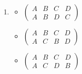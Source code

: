 \begin{enumerate}[{a.}]
\begin{multicols}{3}
\begin{itemize}
	\item
	$\begin{pmatrix}
	A & B & C & D\\
	D & A & B & C
	\end{pmatrix}$

	\item
	$\begin{pmatrix}
	A & B & C & D\\
	D & A & C & B
	\end{pmatrix}$
	
	\item
	$\begin{pmatrix}
	A & B & C & D\\
	D & B & A & C
	\end{pmatrix}$
	
	\item
	$\begin{pmatrix}
	A & B & C & D\\
	D & B & C & A
	\end{pmatrix}$
	
	\item
	$\begin{pmatrix}
	A & B & C & D\\
	D & C & A & B
	\end{pmatrix}$
	
	\item
	$\begin{pmatrix}
	A & B & C & D\\
	D & C & B & A
	\end{pmatrix}$
	\end{itemize}
	\end{multicols}
	
\item
	\begin{multicols}{3}
	\begin{itemize}
	\item
	$\begin{pmatrix}
	A & B & C & D\\
	A & B & D & C
	\end{pmatrix}$
	
	\item
	$\begin{pmatrix}
	A & B & C & D\\
	A & C & B & D
	\end{pmatrix}$
	
	\item
	$\begin{pmatrix}
	A & B & C & D\\
	A & C & D & B
	\end{pmatrix}$
	

\end{itemize}
\end{multicols}
\end{enumerate}
